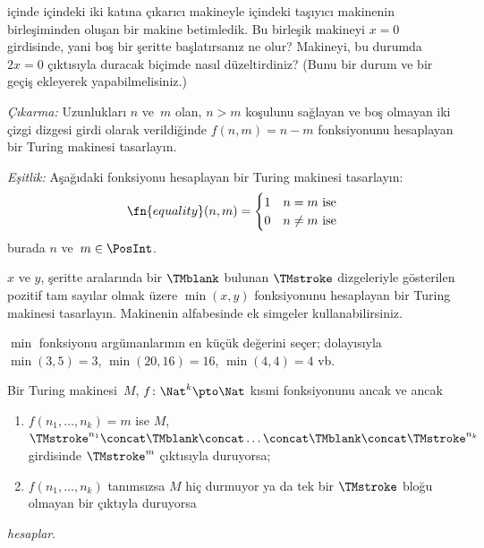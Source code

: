 \documentclass[../../../include/open-logic-section]{subfiles}
\begin{document}
\begin{prob}
 içinde
 içindeki iki katına çıkarıcı makineyle
 içindeki taşıyıcı makinenin birleşiminden
oluşan bir makine betimledik. Bu birleşik makineyi $x=0$ girdisinde, yani boş
bir şeritte başlatırsanız ne olur? Makineyi, bu durumda $2x=0$ çıktısıyla
duracak biçimde nasıl düzeltirdiniz? (Bunu bir durum ve bir geçiş ekleyerek
yapabilmelisiniz.)
\end{prob}

\begin{prob}
\emph{Çıkarma:} Uzunlukları $n$ ve~$m$ olan, $n>m$ koşulunu sağlayan ve boş
olmayan iki çizgi dizgesi girdi olarak verildiğinde $f(n,m)=n-m$ fonksiyonunu
hesaplayan bir Turing makinesi tasarlayın.
\end{prob}

\begin{prob}
\emph{Eşitlik:} Aşağıdaki fonksiyonu hesaplayan bir Turing makinesi
tasarlayın:
\[
\fn{equality}(n,m) = 
\begin{cases}
  \text{1} & \text{$n = m$ ise} \\
  \text{0} & \text{$n \neq m$ ise}
\end{cases}
\]
burada $n$ ve~$m \in \PosInt$.
\end{prob}

\begin{prob}
$x$ ve $y$, şeritte aralarında bir $\TMblank$ bulunan $\TMstroke$
dizgeleriyle gösterilen pozitif tam sayılar olmak üzere $\min(x,y)$
fonksiyonunu hesaplayan bir Turing makinesi tasarlayın. Makinenin
alfabesinde ek simgeler kullanabilirsiniz.

$\min$ fonksiyonu argümanlarının en küçük değerini seçer; dolayısıyla
$\min(3,5)=3$, $\min(20,16)=16$, $\min(4,4)=4$ vb.
\end{prob}

\begin{defn}
  Bir Turing makinesi~$M$, $f\colon \Nat^k \pto \Nat$ kısmi fonksiyonunu
  ancak ve ancak
  \begin{enumerate}
    \item $f(n_1, \dots, n_k)=m$ ise $M$, $\TMstroke^{n_1}\concat\TMblank\concat
    \dots \concat\TMblank\concat\TMstroke^{n_k}$ girdisinde
    $\TMstroke^{m}$ çıktısıyla duruyorsa;
    \item $f(n_1, \dots, n_k)$ tanımsızsa $M$ hiç durmuyor ya da tek bir
    $\TMstroke$ bloğu olmayan bir çıktıyla duruyorsa
  \end{enumerate}
  \emph{hesaplar}.
\end{defn}
\end{document}
